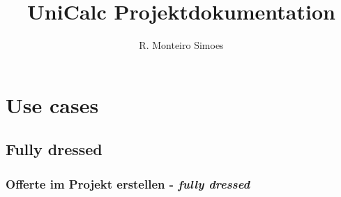 \documentclass[a4paper,12pt]{article}
\begin{document}
	
	\title{UniCalc Projektdokumentation}
	\author{R. Monteiro Simoes}
	\maketitle

	\newpage

	\tableofcontents

	\newpage
    \section{Use cases}
    \subsection{Fully dressed}
	\subsubsection{Offerte im Projekt erstellen - \emph{fully dressed}}
	
\end{document}
